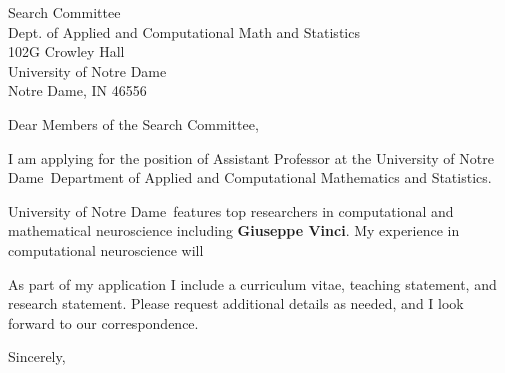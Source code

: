\documentclass[11pt,a4paper]{letter}
\begin{document}

\def\School{University of Notre Dame}

\begin{letter}
{Search Committee\\
Dept. of Applied and Computational Math and Statistics\\
102G Crowley Hall\\
University of Notre Dame\\
Notre Dame, IN 46556}


\opening{Dear Members of the Search Committee,}

I am applying for the position of Assistant Professor at the \School~Department of Applied and Computational Mathematics and Statistics. 



\School~features top researchers in computational and mathematical neuroscience including \textbf{Giuseppe Vinci}. My experience in computational neuroscience will 



As part of my application I include a curriculum vitae, teaching statement, and research statement. Please request additional details as needed, and I look forward to our correspondence.

\closing{Sincerely,}
\end{letter}
\end{document}
